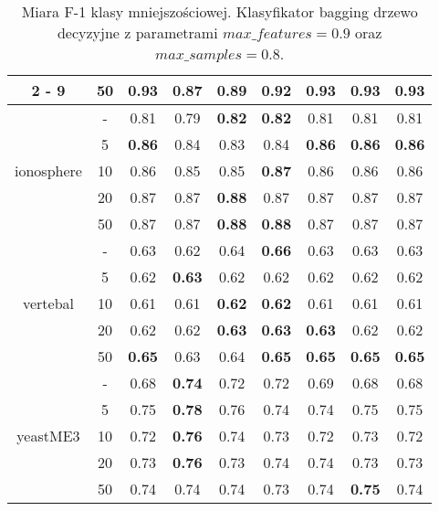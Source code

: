 \begin{table}[H]
\begin{center}
{\begin{tabular}{c|c|ccccccc}
				\cline{2%
					-%
					9}%
				&50&\textbf{0.93}&0.87&0.89&0.92&\textbf{0.93}&\textbf{0.93}&\textbf{0.93}\\%
				\hline%
				\multirow{5}{*}{ionosphere}&{-}&0.81&0.79&\textbf{0.82}&\textbf{0.82}&0.81&0.81&0.81\\%
				\cline{2%
					-%
					9}%
				&5&\textbf{0.86}&0.84&0.83&0.84&\textbf{0.86}&\textbf{0.86}&\textbf{0.86}\\%
				\cline{2%
					-%
					9}%
				&10&0.86&0.85&0.85&\textbf{0.87}&0.86&0.86&0.86\\%
				\cline{2%
					-%
					9}%
				&20&0.87&0.87&\textbf{0.88}&0.87&0.87&0.87&0.87\\%
				\cline{2%
					-%
					9}%
				&50&0.87&0.87&\textbf{0.88}&\textbf{0.88}&0.87&0.87&0.87\\%
				\hline%
				\multirow{5}{*}{vertebal}&{-}&0.63&0.62&0.64&\textbf{0.66}&0.63&0.63&0.63\\%
				\cline{2%
					-%
					9}%
				&5&0.62&\textbf{0.63}&0.62&0.62&0.62&0.62&0.62\\%
				\cline{2%
					-%
					9}%
				&10&0.61&0.61&\textbf{0.62}&\textbf{0.62}&0.61&0.61&0.61\\%
				\cline{2%
					-%
					9}%
				&20&0.62&0.62&\textbf{0.63}&\textbf{0.63}&\textbf{0.63}&0.62&0.62\\%
				\cline{2%
					-%
					9}%
				&50&\textbf{0.65}&0.63&0.64&\textbf{0.65}&\textbf{0.65}&\textbf{0.65}&\textbf{0.65}\\%
				\hline%
				\multirow{5}{*}{yeastME3}&{-}&0.68&\textbf{0.74}&0.72&0.72&0.69&0.68&0.68\\%
				\cline{2%
					-%
					9}%
				&5&0.75&\textbf{0.78}&0.76&0.74&0.74&0.75&0.75\\%
				\cline{2%
					-%
					9}%
				&10&0.72&\textbf{0.76}&0.74&0.73&0.72&0.73&0.72\\%
				\cline{2%
					-%
					9}%
				&20&0.73&\textbf{0.76}&0.73&0.74&0.74&0.73&0.73\\%
				\cline{2%
					-%
					9}%
				&50&0.74&0.74&0.74&0.73&0.74&\textbf{0.75}&0.74\\%
				\hline%
			\end{tabular}}
			\caption{Miara F-1 klasy mniejszościowej. Klasyfikator bagging drzewo decyzyjne z parametrami $max\_features = 0.9$ oraz $max\_samples = 0.8$.}
			\label{baggingdrzewo2f1}
		\end{center}
	\end{table}
	
